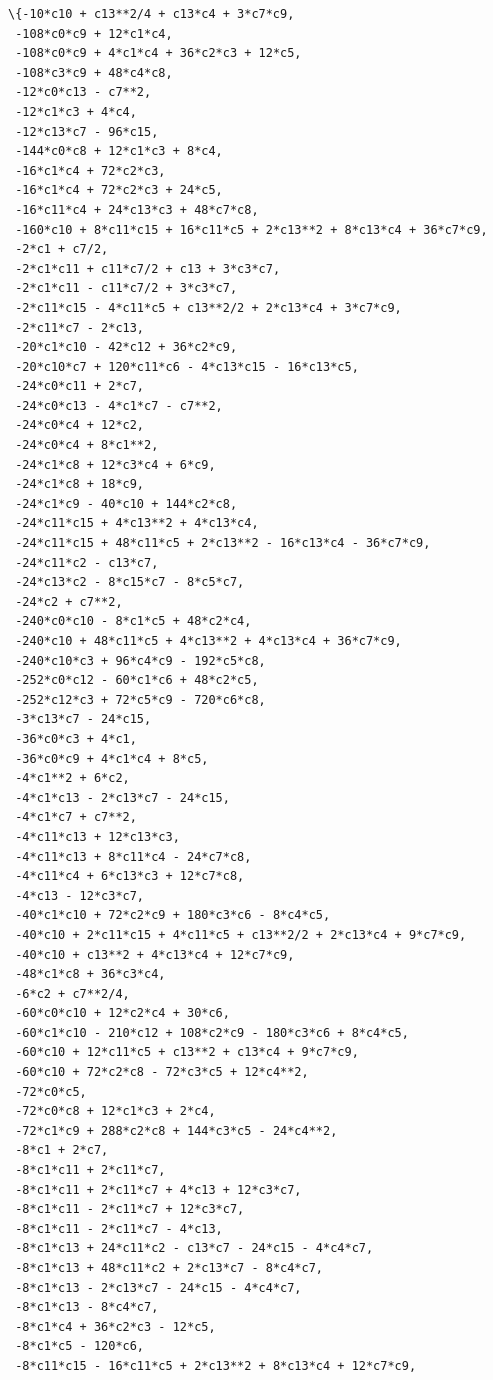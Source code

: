 \documentclass[11pt]{article}
\makeatletter
\newcommand{\boxspacing}{\kern\kvtcb@left@rule\kern\kvtcb@boxsep}
\newcommand{\prompt}[4]{
        {\ttfamily\llap{{\color{#2}[#3]:\hspace{3pt}#4}}\vspace{-\baselineskip}}
    }
\makeatother
\begin{document}
            \begin{tcolorbox}[breakable, size=fbox, boxrule=.5pt, pad at break*=1mm, opacityfill=0]
\prompt{Out}{outcolor}{11}{\boxspacing}
\begin{Verbatim}[commandchars=\\\{\}]
\{-10*c10 + c13**2/4 + c13*c4 + 3*c7*c9,
 -108*c0*c9 + 12*c1*c4,
 -108*c0*c9 + 4*c1*c4 + 36*c2*c3 + 12*c5,
 -108*c3*c9 + 48*c4*c8,
 -12*c0*c13 - c7**2,
 -12*c1*c3 + 4*c4,
 -12*c13*c7 - 96*c15,
 -144*c0*c8 + 12*c1*c3 + 8*c4,
 -16*c1*c4 + 72*c2*c3,
 -16*c1*c4 + 72*c2*c3 + 24*c5,
 -16*c11*c4 + 24*c13*c3 + 48*c7*c8,
 -160*c10 + 8*c11*c15 + 16*c11*c5 + 2*c13**2 + 8*c13*c4 + 36*c7*c9,
 -2*c1 + c7/2,
 -2*c1*c11 + c11*c7/2 + c13 + 3*c3*c7,
 -2*c1*c11 - c11*c7/2 + 3*c3*c7,
 -2*c11*c15 - 4*c11*c5 + c13**2/2 + 2*c13*c4 + 3*c7*c9,
 -2*c11*c7 - 2*c13,
 -20*c1*c10 - 42*c12 + 36*c2*c9,
 -20*c10*c7 + 120*c11*c6 - 4*c13*c15 - 16*c13*c5,
 -24*c0*c11 + 2*c7,
 -24*c0*c13 - 4*c1*c7 - c7**2,
 -24*c0*c4 + 12*c2,
 -24*c0*c4 + 8*c1**2,
 -24*c1*c8 + 12*c3*c4 + 6*c9,
 -24*c1*c8 + 18*c9,
 -24*c1*c9 - 40*c10 + 144*c2*c8,
 -24*c11*c15 + 4*c13**2 + 4*c13*c4,
 -24*c11*c15 + 48*c11*c5 + 2*c13**2 - 16*c13*c4 - 36*c7*c9,
 -24*c11*c2 - c13*c7,
 -24*c13*c2 - 8*c15*c7 - 8*c5*c7,
 -24*c2 + c7**2,
 -240*c0*c10 - 8*c1*c5 + 48*c2*c4,
 -240*c10 + 48*c11*c5 + 4*c13**2 + 4*c13*c4 + 36*c7*c9,
 -240*c10*c3 + 96*c4*c9 - 192*c5*c8,
 -252*c0*c12 - 60*c1*c6 + 48*c2*c5,
 -252*c12*c3 + 72*c5*c9 - 720*c6*c8,
 -3*c13*c7 - 24*c15,
 -36*c0*c3 + 4*c1,
 -36*c0*c9 + 4*c1*c4 + 8*c5,
 -4*c1**2 + 6*c2,
 -4*c1*c13 - 2*c13*c7 - 24*c15,
 -4*c1*c7 + c7**2,
 -4*c11*c13 + 12*c13*c3,
 -4*c11*c13 + 8*c11*c4 - 24*c7*c8,
 -4*c11*c4 + 6*c13*c3 + 12*c7*c8,
 -4*c13 - 12*c3*c7,
 -40*c1*c10 + 72*c2*c9 + 180*c3*c6 - 8*c4*c5,
 -40*c10 + 2*c11*c15 + 4*c11*c5 + c13**2/2 + 2*c13*c4 + 9*c7*c9,
 -40*c10 + c13**2 + 4*c13*c4 + 12*c7*c9,
 -48*c1*c8 + 36*c3*c4,
 -6*c2 + c7**2/4,
 -60*c0*c10 + 12*c2*c4 + 30*c6,
 -60*c1*c10 - 210*c12 + 108*c2*c9 - 180*c3*c6 + 8*c4*c5,
 -60*c10 + 12*c11*c5 + c13**2 + c13*c4 + 9*c7*c9,
 -60*c10 + 72*c2*c8 - 72*c3*c5 + 12*c4**2,
 -72*c0*c5,
 -72*c0*c8 + 12*c1*c3 + 2*c4,
 -72*c1*c9 + 288*c2*c8 + 144*c3*c5 - 24*c4**2,
 -8*c1 + 2*c7,
 -8*c1*c11 + 2*c11*c7,
 -8*c1*c11 + 2*c11*c7 + 4*c13 + 12*c3*c7,
 -8*c1*c11 - 2*c11*c7 + 12*c3*c7,
 -8*c1*c11 - 2*c11*c7 - 4*c13,
 -8*c1*c13 + 24*c11*c2 - c13*c7 - 24*c15 - 4*c4*c7,
 -8*c1*c13 + 48*c11*c2 + 2*c13*c7 - 8*c4*c7,
 -8*c1*c13 - 2*c13*c7 - 24*c15 - 4*c4*c7,
 -8*c1*c13 - 8*c4*c7,
 -8*c1*c4 + 36*c2*c3 - 12*c5,
 -8*c1*c5 - 120*c6,
 -8*c11*c15 - 16*c11*c5 + 2*c13**2 + 8*c13*c4 + 12*c7*c9,

\end{Verbatim}
\end{tcolorbox}
\end{document}
